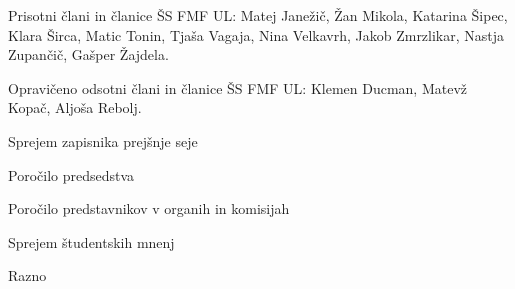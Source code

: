 \documentclass{seja}
\begin{document}
Prisotni člani in članice ŠS FMF UL:
Matej Janežič, Žan Mikola, Katarina Šipec, Klara Širca, Matic Tonin, Tjaša Vagaja, Nina Velkavrh, Jakob Zmrzlikar, Nastja Zupančič, Gašper Žajdela.

Opravičeno odsotni člani in članice ŠS FMF UL: Klemen Ducman, Matevž Kopač, Aljoša Rebolj.

\begin{red*}
	\item
	Sprejem zapisnika prejšnje seje
	\item
	Poročilo predsedstva
	\item
	Poročilo predstavnikov v organih in komisijah
    \item
    Sprejem študentskih mnenj
    \item
     Razno
\end{red*}
\end{document}
